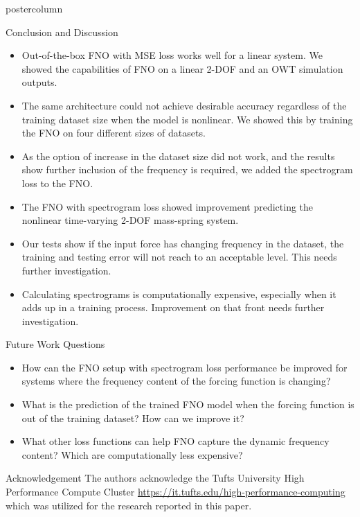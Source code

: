 \documentclass[mathserif]{beamer}
\begin{document}
\begin{frame}
\begin{columns}
\begin{beamercolorbox}[center,wd=\textwidth]{postercolumn}
\begin{minipage}[T]{.95\linewidth}
{\begin{block}{Conclusion and Discussion}

\begin{itemize}
    \item Out-of-the-box FNO with MSE loss works well for a linear system. We showed the capabilities of FNO on a linear 2-DOF and an OWT simulation outputs.
    \item The same architecture could not achieve desirable accuracy regardless of the training dataset size when the model is nonlinear. We showed this by training the FNO on four different sizes of datasets.
    \item As the option of increase in the dataset size did not work, and the results show further inclusion of the frequency is required, we added the spectrogram loss to the FNO.
    \item The FNO with spectrogram loss showed improvement predicting the nonlinear time-varying 2-DOF mass-spring system.
    \item Our tests show if the input force has changing frequency in the dataset, the training and testing error will not reach to an acceptable level. This needs further investigation.
    \item Calculating spectrograms is computationally expensive, especially when it adds up in a training process. Improvement on that front needs further investigation.
\end{itemize}

\end{block}
			
\begin{block}{Future Work Questions}
\begin{itemize}
    \item How can the FNO setup with spectrogram loss performance be improved for systems where the frequency content of the forcing function is changing?
    \item What is the prediction of the trained FNO model when the forcing function is out of the training dataset? How can we improve it?
    \item What other loss functions can help FNO capture the dynamic frequency content? Which are computationally less expensive?
\end{itemize}
\end{block}
				
				 \begin{block}{Acknowledgement}
			The authors acknowledge the Tufts University High Performance Compute Cluster \url{https://it.tufts.edu/high-performance-computing} which was utilized for the research reported in this paper.
				 \end{block}
				 
}
\end{minipage}
\end{beamercolorbox}
\end{columns}
\end{frame}
\end{document}
